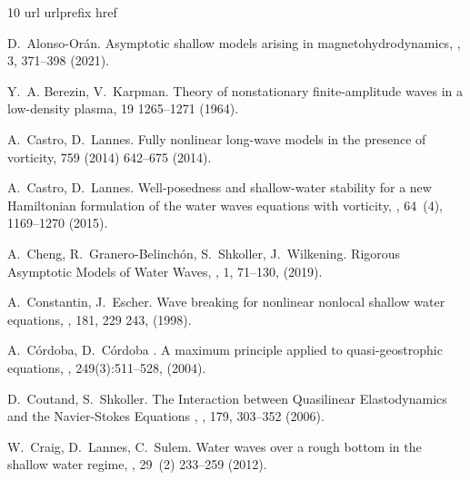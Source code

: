 \documentclass[final,11pt,a4paper,reqno]{amsart}
\theoremstyle{definition}
\begin{document}
\begin{footnotesize}
\begin{thebibliography}{10}
\expandafter\ifx\csname url\endcsname\relax
  \def\url#1{\texttt{#1}}\fi
\expandafter\ifx\csname urlprefix\endcsname\relax\def\urlprefix{URL }\fi
\expandafter\ifx\csname href\endcsname\relax
  \def\href#1#2{#2} \def\path#1{#1}\fi

D.~Alonso-Or\'{a}n. Asymptotic shallow models arising in magnetohydrodynamics,  
, 3, 371--398 (2021).


Y.~A. Berezin, V.~Karpman. Theory of nonstationary finite-amplitude waves in a
  low-density plasma, 19  1265--1271 (1964).


A.~Castro, D.~Lannes. Fully nonlinear long-wave models in the presence of
vorticity,  759 (2014) 642--675 (2014).

A.~Castro, D.~Lannes. Well-posedness and shallow-water stability for a new
{H}amiltonian formulation of the water waves equations with vorticity,
, 64~(4), 1169--1270 (2015).

A.~Cheng, R.~Granero-Belinch\'on, S.~Shkoller, J.~Wilkening. 
{R}igorous
{A}symptotic {M}odels of {W}ater {W}aves, , 1, 71–130, (2019).

A.~Constantin, J.~Escher.
\newblock Wave breaking for nonlinear nonlocal shallow water equations,
, 181, 229 243, (1998).

A.~C\'{o}rdoba, D.~C\'{o}rdoba .
\newblock A maximum principle applied to quasi-geostrophic
equations,
, 249(3):511--528, (2004).


D.~Coutand, S.~Shkoller.
\newblock The Interaction between Quasilinear Elastodynamics and the Navier-Stokes Equations ,
, 179, 303–352 (2006).

W.~Craig, D.~Lannes, C.~Sulem. Water waves over a rough bottom in the shallow
water regime,
, 29~(2)
233--259 (2012).



\end{thebibliography}
\end{footnotesize}
\end{document}
